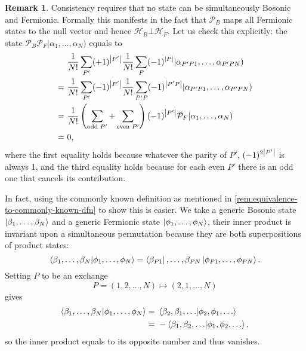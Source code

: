 \documentclass{article}
\theoremstyle{definition}
\newtheorem{rem}{Remark}[section]
\theoremstyle{plain}
\numberwithin{equation}{section}
\begin{document}
\begin{rem}
    Consistency requires that no state can be simultaneously 
    Bosonic and Fermionic. 
    Formally this manifests in the fact that 
    $\mathcal{P}_{B}$ maps 
    all Fermionic states to the null vector and hence 
    $\mathcal{H}_{B} \bot \mathcal{H}_{F}$. 
    Let us check this explicitly: 
    the state
    $\mathcal{P}_{B} \mathcal{P}_{F}|\alpha_1, \ldots ,\alpha_{N})$ 
    equals to
    \begin{align*}
        &\ \frac{1}{N!}\sum_{P'}(+1)^{\abs{P'}}
        \frac{1}{N!}\sum_{P}(-1)^{\abs{P}}
        |\alpha_{P'P1}, \ldots ,\alpha_{P'PN}) \\
        =&\ 
        \frac{1}{N!}\sum_{P'}(-1)^{\abs{P'}}
        \frac{1}{N!}\sum_{P'P}(-1)^{\abs{P'P}}
        |\alpha_{P'P1}, \ldots ,\alpha_{P'PN})
        \\
        =&\ 
        \frac{1}{N!}
        \left( \sum_{\text{odd }P'}+\sum_{\text{even }P'} \right) 
        (-1)^{\abs{P'}}
        \mathcal{P}_{F} |\alpha_1, \ldots ,\alpha_{N})
        \\
        =&\ 
        0,
    \end{align*}
    where the first equality holds because 
    whatever the parity of $P'$, $(-1)^{2\abs{P'}}$ is always 1, and 
    the third equality holds because 
    for each even $P'$ there is an odd one that cancels its contribution. 

    In fact, using the commonly known definition 
    as mentioned in \cref{rem:equivalence-to-commonly-known-dfn} 
    to show this is easier. We take a generic Bosonic state 
    $\ket{\beta_1, \ldots ,\beta_{N}}$ and a generic Fermionic state 
    $\ket{\phi_{1}, \ldots ,\phi_{N}}$, their inner product 
    is invariant upon a simultaneous permutation 
    because they are both superpositions of product states: 
    \[
        \bra{\beta_1, \ldots ,\beta_{N}} 
        \ket{\phi_1, \ldots ,\phi_{N}}
        =
        \bra{\beta_{P 1}}, \ldots ,\beta_{PN} 
        \ket{\phi_{P 1}, \ldots ,\phi_{PN}}.
    \]
    Setting $P$ to be an exchange 
    \[
        P = (1,2, \ldots ,N) \mapsto 
        (2,1, \ldots ,N)
    \]
    gives 
    \begin{align*}
        \bra{\beta_1, \ldots ,\beta_{N}} 
        \ket{\phi_1, \ldots ,\phi_{N}}
        =&\ 
        \bra{\beta_2,\beta_1, \ldots }
        \ket{\phi_2,\phi_1, \ldots } \\
        =&\ 
        - \bra{\beta_1,\beta_2, \ldots }
        \ket{\phi_1, \phi_2, \ldots },
    \end{align*}
    so the inner product equals to its 
    opposite number and thus vanishes.
\end{rem}
\end{document}
